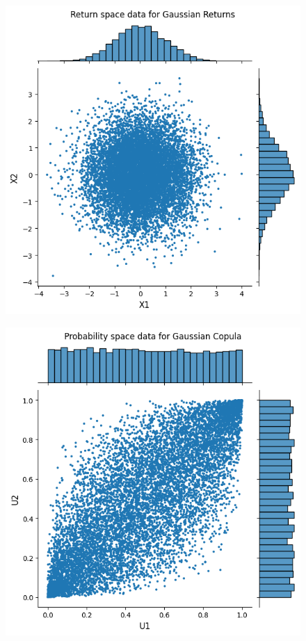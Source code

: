 \begin{figure}
    \centering
    \begin{minipage}{0.4\textwidth}
        \centering
        \includegraphics[width=\textwidth]{3Theory/pictures/IndependentRet.png}
        \label{fig:UncorrelatedScatter}
    \end{minipage}
    \hfill
    \begin{minipage}{0.4\textwidth}
        \centering
        \includegraphics[width=\textwidth]{3Theory/pictures/GaussianProbScatter.png}

\end{minipage}
\end{figure}
